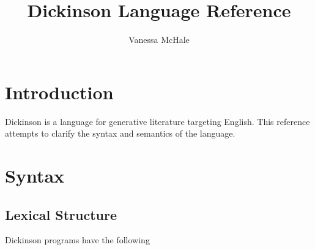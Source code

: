 \documentclass{book}
\begin{document}
\title{Dickinson Language Reference}
\author {Vanessa McHale}
\maketitle

\section{Introduction}

Dickinson is a language for generative literature targeting English. This reference attempts to clarify the syntax and semantics of the language.

\section{Syntax}

\subsection{Lexical Structure}


Dickinson programs have the following
\end{document}
